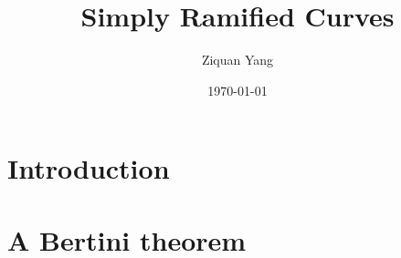 \documentclass[12pt]{article}
\theoremstyle{plain}
\theoremstyle{definition}
\newcommand{\<}{\langle}
\renewcommand{\>}{\rangle}
\begin{document}
%

\title{Simply Ramified Curves}
\author{Ziquan Yang}


\date{\today}

\maketitle

 

\setcounter{section}{0}
\section{Introduction}
\section{A Bertini theorem}
\end{document}
